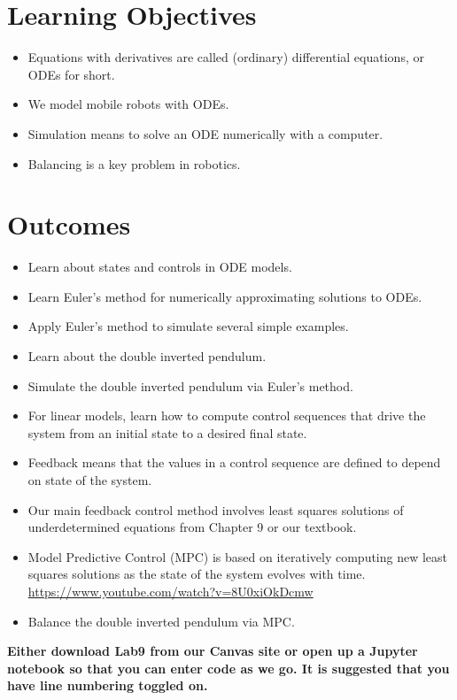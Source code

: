 \section*{Learning Objectives}

\begin{itemize}
\item Equations with derivatives are called (ordinary) differential equations, or ODEs for short.
\item We model mobile robots with ODEs.
\item Simulation means to solve an ODE numerically with a computer.
\item Balancing is a key problem in robotics.
\end{itemize}

\section*{Outcomes} 
\begin{itemize}
\item Learn about states and controls in ODE models.
\item Learn Euler's method for numerically approximating solutions to ODEs.
\item Apply Euler's method to simulate several simple examples.
\item Learn about the double inverted pendulum.
\item Simulate the double inverted pendulum via Euler's method.
\item For linear models, learn how to compute control sequences that drive the system from an initial state to a desired final state.
\item Feedback means that the values in a control sequence are defined to depend on state of the system.
\item Our main feedback control method involves least squares solutions of underdetermined equations from Chapter 9 or our textbook.
\item Model Predictive Control (MPC) is based on iteratively computing new least squares solutions as the state of the system evolves with time. \url{https://www.youtube.com/watch?v=8U0xiOkDcmw}
\item Balance the double inverted pendulum via MPC.
\end{itemize}

\vspace*{1cm}

\textbf{Either download Lab9 from our Canvas site or open up a Jupyter notebook so that you can enter code as we go. It is suggested that you have line numbering toggled on.}  


